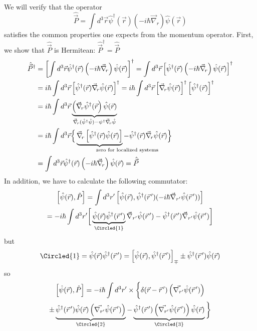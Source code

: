 \documentclass[12pt]{article}
\newcommand{\be}{\begin{equation}}
\newcommand{\ee}{\end{equation}}
\newcommand{\vecrp}{\ensuremath{\vec{r}^{\,\prime}}}
\newcommand{\vecnr}{\ensuremath{\vec{\nabla}_{\!r}}}
\begin{document}
We will verify that the operator
\be
\hat{\vec{P}}=\int d^{3}\vec{r} \hat{\psi}^{\dagger}(\vec{r})\left(-i \hbar \vecnr\right) \hat{\psi}(\vec{r})
\ee
satisfies the common properties one expects from the
momentum operator. First, we show that $\hat{\vec{P}}$ is Hermitean: $\hat{\vec{P}}^\dagger = \hat{\vec{P}}$
%
\be
\begin{aligned}
\hat{\vec{P}}^{\dagger}
&=\left[\int d^{3}\vec{r} \hat{\psi}^{\dagger}(\vec{r})\left(-i \hbar \vecnr\right) \hat{\psi}(\vec{r})\right]^{\dagger}
=\int d^{3} \vec{r} \left[\hat{\psi}^{\dagger}(\vec{r})\left(-i \hbar \vecnr\right) \hat{\psi}(\vec{r})\right]^{\dagger}\\
&=i\hbar \int d^{3}\vec{r} \left[\hat{\psi}^{\dagger}(\vec{r})\vecnr \hat{\psi}(\vec{r})\right]^{\dagger}
 =i\hbar \int d^{3}\vec{r} \left[\vecnr\hat{\psi}(\vec{r})\right]^\dagger \left[\hat{\psi}^\dagger(\vec{r})\right]^\dagger\\
&=i\hbar \int d^{3}\vec{r} \underbrace{\left(\vecnr\hat{\psi}^\dagger(\vec{r}\right) \hat{\psi}(\vec{r})}%
_{\vecnr(\hat\psi^\dagger\hat\psi) - \psi^\dagger\vecnr\hat\psi}\\
&=i\hbar \int d^{3}\vec{r}
\Big\{
\underbrace{\vecnr\left[\hat{\psi}^{\dagger}(\vec{r})\hat{\psi}(\vec{r})\right]}%
_{\mathrlap{\text{zero for localized systems}}\quad}%
- \hat{\psi}^{\dagger}(\vec{r})\vecnr\hat{\psi}(\vec{r})
\Big\}\\
&=\int d^{3}\vec{r} \hat{\psi}^{\dagger}(\vec{r})\left(-i \hbar \vecnr\right) \hat{\psi}(\vec{r}) = \hat{\vec{P}}
\end{aligned}
\ee
In addition, we have to calculate the following commutator:
\[
\begin{gathered}
\left[\hat{\psi}(\vec{r}),\hat{P}\right] = 
\int d^3r^\prime
\left[
\hat{\psi}(\vec{r}),\hat{\psi}^\dagger(\vecrp)(-i\hbar\vec{\nabla}_{r^\prime}\hat{\psi}(\vecrp))
\right]\\
=-i\hbar \int d^3r^\prime
\bigg[
\underbrace{\hat{\psi}(\vec{r}) \hat{\psi}^\dagger(\vecrp)}_{\Circled{1}} \vec{\nabla}_{r^\prime} \hat{\psi}(\vecrp) -
\hat{\psi}^\dagger (\vecrp)\vec{\nabla}_{r^\prime} \hat{\psi}(\vecrp) 
\bigg]
\end{gathered}
\]
but 
\[
\Circled{1}=\hat{\psi}(\vec{r}) \hat{\psi}^\dagger(\vecrp) =
\left[
\hat{\psi}(\vec{r}), \hat{\psi}^\dagger(\vecrp)
\right]_\mp \pm  \hat{\psi}^\dagger(\vecrp)\hat{\psi}(\vec{r})
\]
so
\[
\begin{gathered}
\left[\hat{\psi}(\vec{r}),\hat{P}\right] = -i\hbar \int d^3r^\prime \times
\bigg\{
    \delta(\vec{r}-\vecrp) \left(\vec{\nabla_{r^\prime}}\hat{\psi}(\vecrp)\right)\\ 
	\pm \underbrace{\hat{\psi}^{\dagger}(\vecrp) \hat{\psi}(\vec{r}) \left(\vec{\nabla_{r^\prime}}\hat{\psi}(\vecrp)\right)}%
	_{\Circled{2}}
	- \underbrace{\hat{\psi}^{\dagger}(\vecrp) \left(\vec{\nabla_{r^\prime}}\hat{\psi}(\vecrp)\right) \hat{\psi}(\vec{r})}%
	_{\Circled{3}}
\bigg\}\\
\end{gathered}
\]
\end{document}
